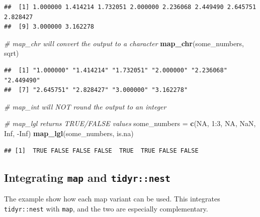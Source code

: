 \documentclass[]{book}
\newenvironment{Shaded}{}{}
\newcommand{\CommentTok}[1]{\textcolor[rgb]{0.38,0.63,0.69}{\textit{#1}}}
\newcommand{\DecValTok}[1]{\textcolor[rgb]{0.25,0.63,0.44}{#1}}
\newcommand{\KeywordTok}[1]{\textcolor[rgb]{0.00,0.44,0.13}{\textbf{#1}}}
\newcommand{\NormalTok}[1]{#1}
\newcommand{\OperatorTok}[1]{\textcolor[rgb]{0.40,0.40,0.40}{#1}}
\newcommand{\OtherTok}[1]{\textcolor[rgb]{0.00,0.44,0.13}{#1}}
\newcommand{\StringTok}[1]{\textcolor[rgb]{0.25,0.44,0.63}{#1}}
\begin{document}
\begin{verbatim}
##  [1] 1.000000 1.414214 1.732051 2.000000 2.236068 2.449490 2.645751 2.828427
##  [9] 3.000000 3.162278
\end{verbatim}

\begin{Shaded}
\begin{Highlighting}[]
\CommentTok{# map_chr will convert the output to a character}
\KeywordTok{map_chr}\NormalTok{(some_numbers, sqrt)}
\end{Highlighting}
\end{Shaded}

\begin{verbatim}
##  [1] "1.000000" "1.414214" "1.732051" "2.000000" "2.236068" "2.449490"
##  [7] "2.645751" "2.828427" "3.000000" "3.162278"
\end{verbatim}

\begin{Shaded}
\begin{Highlighting}[]
\CommentTok{# map_int will NOT round the output to an integer}

\CommentTok{# map_lgl returns TRUE/FALSE values}
\NormalTok{some_numbers =}\StringTok{ }\KeywordTok{c}\NormalTok{(}\OtherTok{NA}\NormalTok{, }\DecValTok{1}\OperatorTok{:}\DecValTok{3}\NormalTok{, }\OtherTok{NA}\NormalTok{, }\OtherTok{NaN}\NormalTok{, }\OtherTok{Inf}\NormalTok{, }\OperatorTok{-}\OtherTok{Inf}\NormalTok{)}
\KeywordTok{map_lgl}\NormalTok{(some_numbers, is.na)}
\end{Highlighting}
\end{Shaded}

\begin{verbatim}
## [1]  TRUE FALSE FALSE FALSE  TRUE  TRUE FALSE FALSE
\end{verbatim}

\hypertarget{integrating-map-and-tidyrnest}{%
\subsection*{\texorpdfstring{Integrating \texttt{map} and \texttt{tidyr::nest}}{Integrating map and tidyr::nest}}\label{integrating-map-and-tidyrnest}}

The example show how each map variant can be used. This integrates \texttt{tidyr::nest} with \texttt{map}, and the two are especially complementary.
\end{document}
